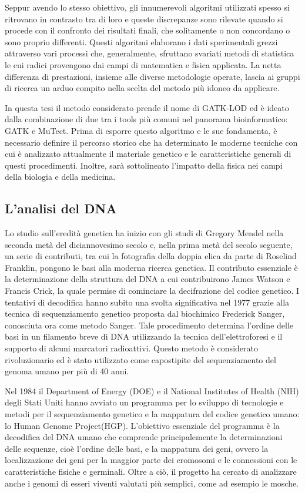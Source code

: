 Seppur avendo lo stesso obiettivo, gli innumerevoli algoritmi utilizzati spesso si ritrovano in contrasto tra di loro e queste discrepanze sono rilevate quando si procede con il confronto dei risultati finali, che solitamente o non concordano o sono proprio differenti.
Questi algoritmi elaborano i dati sperimentali grezzi attraverso vari processi che, generalmente, sfruttano svariati metodi di statistica le cui radici provengono dai campi di matematica e fisica applicata.
La netta differenza di prestazioni, insieme alle diverse metodologie operate, lascia ai gruppi di ricerca un arduo compito nella scelta del metodo più idoneo da applicare.

In questa tesi il metodo considerato prende il nome di GATK-LOD ed è ideato dalla combinazione di due tra i tools più comuni nel panorama bioinformatico: GATK e MuTect.
Prima di esporre questo algoritmo e le sue fondamenta, è necessario definire il percorso storico che ha determinato le moderne tecniche con cui è analizzato attualmente il materiale genetico e le caratteristiche generali di questi procedimenti.
Inoltre, sarà sottolineato l'impatto della fisica nei campi della biologia e della medicina.

\subsection{L'analisi del DNA}
Lo studio sull'eredità genetica ha inizio con gli studi di Gregory Mendel nella seconda metà del diciannovesimo secolo e, nella prima metà del secolo seguente, un serie di contributi, tra cui la fotografia della doppia elica da parte di Roselind Franklin, pongono le basi alla moderna ricerca genetica.
Il contributo essenziale è la determinazione della struttura del DNA a cui contribuirono James Watson e Francis Crick, la quale permise di cominciare la decifrazione del codice genetico.
I tentativi di decodifica hanno subito una svolta significativa nel 1977 grazie alla tecnica di sequenziamento genetico proposta dal biochimico Frederick Sanger, conosciuta ora come metodo Sanger.
Tale procedimento determina l'ordine delle basi in un filamento breve di DNA utilizzando la tecnica dell'elettroforesi e il supporto di alcuni marcatori radioattivi.
Questo metodo è considerato rivoluzionario ed è stato utilizzato come capostipite del sequenziamento del genoma umano per più di 40 anni.

Nel 1984 il Department of Energy (DOE) e il National Institutes of Health (NIH) degli Stati Uniti hanno avviato un programma per lo sviluppo di tecnologie e metodi per il sequenziamento genetico e la mappatura del codice genetico umano: lo Human Genome Project(HGP).
L'obiettivo essenziale del programma è la decodifica del DNA umano che comprende principalemente la determinazioni delle sequenze, cioè l'ordine delle basi, e la mappatura dei geni, ovvero la localizzazione dei geni per la maggior parte dei cromosomi e le connessioni con le caratteristiche fisiche e germinali.
Oltre a ciò, il progetto ha cercato di analizzare anche i genomi di esseri viventi valutati più semplici, come ad esempio le mosche.

